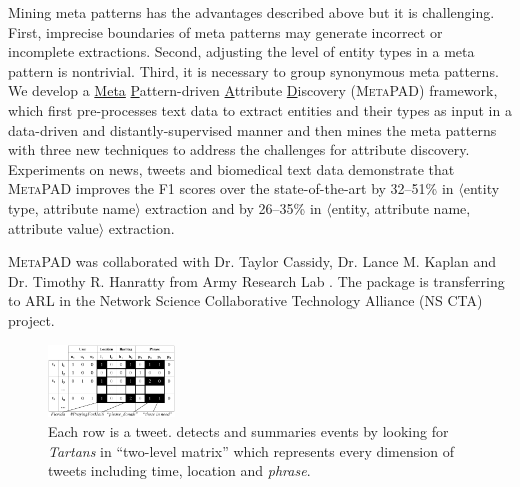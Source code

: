\documentclass[10.5pt]{article}
\newcommand{\lb}{\mbox{$\langle$}}
\newcommand{\rb}{\mbox{$\rangle$}}
\newcommand{\pair}[2]{{\lb#1, #2\rb}\xspace}
\newcommand{\tuple}[3]{{\lb#1, #2, #3\rb}\xspace}
\begin{document}
Mining meta patterns has the advantages described above but it is challenging. First, imprecise boundaries of meta patterns may generate incorrect or incomplete extractions. Second, adjusting the level of entity types in a meta pattern is nontrivial. Third, it is necessary to group synonymous meta patterns. We develop a \underline{Meta} \underline{P}attern-driven \underline{A}ttribute \underline{D}iscovery (\textsc{MetaPAD}) framework, which first pre-processes text data to extract entities and their types as input in a data-driven and distantly-supervised manner and then mines the meta patterns with three new techniques to address the challenges for attribute discovery. Experiments on news, tweets and biomedical text data demonstrate that \textsc{MetaPAD} improves the F1 scores over the state-of-the-art by 32--51\% in \pair{entity type}{attribute name} extraction and by 26--35\% in \tuple{entity}{attribute name}{attribute value} extraction.

\begin{compactitem}
\item \textsc{MetaPAD} was collaborated with Dr. Taylor Cassidy, Dr. Lance M. Kaplan and Dr. Timothy R. Hanratty from Army Research Lab \cite{jiang2016metapad}. The package is transferring to ARL in the Network Science Collaborative Technology Alliance (NS CTA) project. 
\end{compactitem}

\vskip 0.05in
\vskip 0.01in


\begin{figure}
\vskip -0.18in
\includegraphics[width=0.3\textwidth]{figure/catchtartan.pdf}
\vskip -0.18in
\caption{Each row is a tweet. \cite{jiang2016catchtartan} detects and summaries events by looking for \textit{Tartans} in ``two-level matrix'' which represents every dimension of tweets including time, location and \textit{phrase}.}
\label{fig:catchtartan}
\vskip -0.20in
\end{figure}
\end{document}
